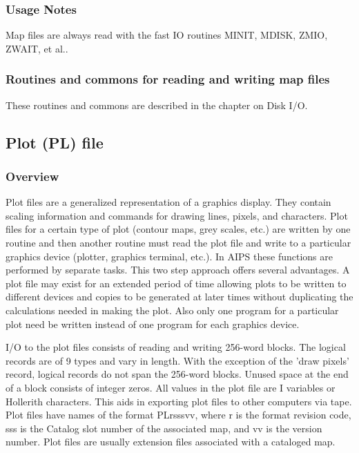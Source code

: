 \subsubsection{Usage Notes}

     Map files are always read with the fast IO routines
MINIT, MDISK, ZMIO,
ZWAIT, et al..


\subsubsection{Routines and commons for reading and writing map files}

     These routines and commons are described in the chapter on Disk
I/O.

\subsection{Plot (PL) file}
\subsubsection{Overview}
 
 
   Plot files are a generalized representation of a graphics display.
They contain scaling information and commands for drawing lines,
pixels, and characters.  Plot files for a certain type of plot
(contour maps, grey scales, etc.) are written by one routine
and then another routine must read the plot file and write to
a particular graphics device (plotter, graphics terminal, etc.).
In AIPS these functions are performed by separate tasks.
This two step approach offers several advantages.  A plot
file may exist for an extended period of time allowing plots to be
written to different devices and copies to be generated at later times
without duplicating the calculations needed in making the plot.
Also only one program for a particular plot need be written instead
of one program for each graphics device.
 
   I/O to the plot files consists of reading and writing 256-word
blocks.  The logical records are of 9 types and vary in length.  With
the exception of the 'draw pixels' record, logical records do not span
the 256-word blocks.  Unused space at the end of a block consists of
integer zeros.  All values in the plot file are I variables or Hollerith
characters.  This aids in exporting plot files to other computers via
tape.  Plot files have names of the format PLrsssvv, where r is the
format revision code, sss is the Catalog slot number of the associated
map, and vv is the version number.  Plot files are usually extension
files associated with a cataloged map.
 
